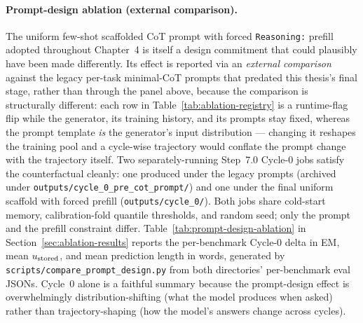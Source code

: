 \paragraph{Prompt-design ablation (external comparison).}
\label{par:prompt-design-ablation}
The uniform few-shot scaffolded CoT prompt with forced \texttt{Reasoning:} prefill adopted throughout Chapter~4 is itself a design commitment that could plausibly have been made differently. Its effect is reported via an \emph{external comparison} against the legacy per-task minimal-CoT prompts that predated this thesis's final stage, rather than through the panel above, because the comparison is structurally different: each row in Table~\ref{tab:ablation-registry} is a runtime-flag flip while the generator, its training history, and its prompts stay fixed, whereas the prompt template \emph{is} the generator's input distribution --- changing it reshapes the training pool and a cycle-wise trajectory would conflate the prompt change with the trajectory itself. Two separately-running Step~7.0 Cycle-0 jobs satisfy the counterfactual cleanly: one produced under the legacy prompts (archived under \texttt{outputs/cycle\_0\_pre\_cot\_prompt/}) and one under the final uniform scaffold with forced prefill (\texttt{outputs/cycle\_0/}). Both jobs share cold-start memory, calibration-fold quantile thresholds, and random seed; only the prompt and the prefill constraint differ. Table~\ref{tab:prompt-design-ablation} in Section~\ref{sec:ablation-results} reports the per-benchmark Cycle-0 delta in EM, mean $u_{\text{stored}}$, and mean prediction length in words, generated by \texttt{scripts/compare\_prompt\_design.py} from both directories' per-benchmark eval JSONs. Cycle~0 alone is a faithful summary because the prompt-design effect is overwhelmingly distribution-shifting (what the model produces when asked) rather than trajectory-shaping (how the model's answers change across cycles).

